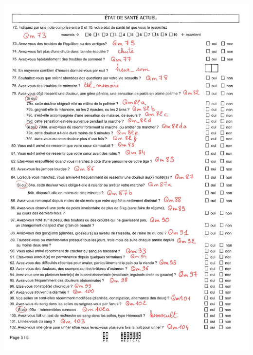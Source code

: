 \documentclass{book}
\begin{document}
\includegraphics[scale=.28]{quest_ipc-5.png}
\newpage
\end{document}
